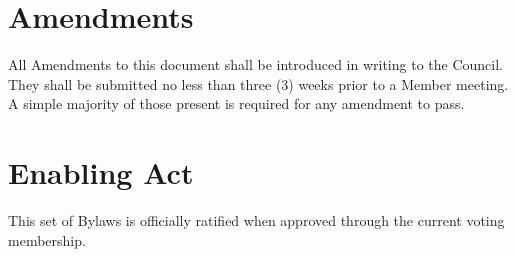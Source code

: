 \documentclass[12pt]{article}
\begin{document}
\section{Amendments}\label{amendments}
\begin{level} 
    \item All Amendments to this document shall be introduced in writing to the Council. They shall be submitted no less than three (3) weeks prior to a Member meeting. A simple majority of those present is required for any amendment to pass.
\end{level}

\section{Enabling Act}
\begin{level} 
    \item This set of Bylaws is officially ratified when approved through the current voting membership.
\end{level}

\end{document}
